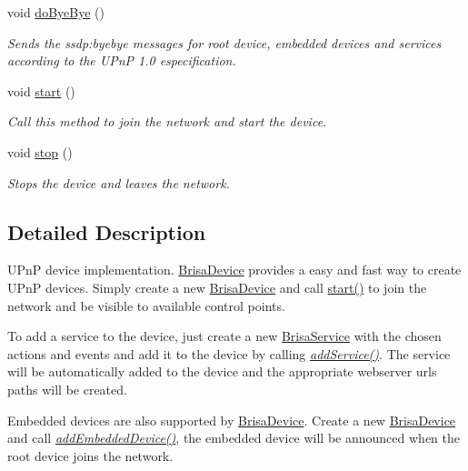 \begin{DoxyCompactItemize}
void \hyperlink{classBrisaUpnp_1_1BrisaDevice_ac0daff83881c5883d9e7f49911c14d4d}{doByeBye} ()
\begin{DoxyCompactList}\small\item\em Sends the ssdp:byebye messages for root device, embedded devices and services according to the UPnP 1.0 especification. \item\end{DoxyCompactList}\item 
void \hyperlink{classBrisaUpnp_1_1BrisaDevice_a5f6f1e5eeebfaf63ba0ac669ced3845c}{start} ()
\begin{DoxyCompactList}\small\item\em Call this method to join the network and start the device. \item\end{DoxyCompactList}\item 
void \hyperlink{classBrisaUpnp_1_1BrisaDevice_af42bba26bf50a602e55a5d4836501362}{stop} ()
\begin{DoxyCompactList}\small\item\em Stops the device and leaves the network. \item\end{DoxyCompactList}\end{DoxyCompactItemize}


\subsection{Detailed Description}
UPnP device implementation. \hyperlink{classBrisaUpnp_1_1BrisaDevice}{BrisaDevice} provides a easy and fast way to create UPnP devices. Simply create a new \hyperlink{classBrisaUpnp_1_1BrisaDevice}{BrisaDevice} and call \hyperlink{classBrisaUpnp_1_1BrisaDevice_a5f6f1e5eeebfaf63ba0ac669ced3845c}{start()} to join the network and be visible to available control points.

To add a service to the device, just create a new \hyperlink{classBrisaUpnp_1_1BrisaService}{BrisaService} with the chosen actions and events and add it to the device by calling {\itshape \hyperlink{classBrisaUpnp_1_1BrisaDevice_a2a5879c40079f073fc08b06d99427dcd}{addService()}\/}. The service will be automatically added to the device and the appropriate webserver urls paths will be created.

Embedded devices are also supported by \hyperlink{classBrisaUpnp_1_1BrisaDevice}{BrisaDevice}. Create a new \hyperlink{classBrisaUpnp_1_1BrisaDevice}{BrisaDevice} and call {\itshape \hyperlink{classBrisaUpnp_1_1BrisaDevice_a5b549e316a783368e9bf0e0ffd09a5e4}{addEmbeddedDevice()}\/}, the embedded device will be announced when the root device joins the network.

